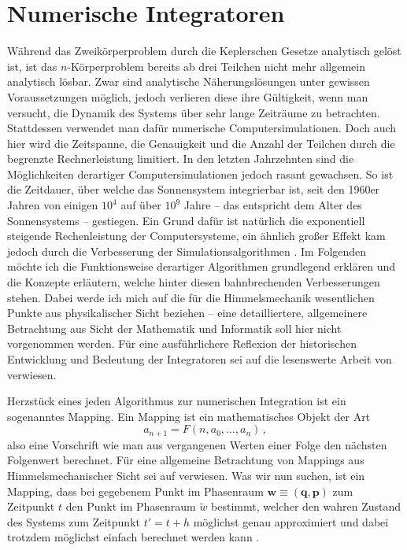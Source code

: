 \documentclass[12pt,a4paper,twoside,open=right,bibliography=totoc]{scrbook}
\renewcommand{\cite}{ \citep}
\renewcommand{\vec}{\mathbf}
\begin{document}
\section{Numerische Integratoren}
Während das Zweikörperproblem durch die Keplerschen Gesetze analytisch gelöst ist, ist das $n$-Körperproblem bereits ab drei Teilchen nicht mehr allgemein analytisch lösbar.
Zwar sind analytische Näherungslösungen unter gewissen Voraussetzungen möglich, jedoch verlieren diese ihre Gültigkeit, wenn man versucht, die Dynamik des Systems über sehr lange Zeiträume zu betrachten. Stattdessen verwendet man dafür numerische Computersimulationen.
Doch auch hier wird die Zeitspanne, die Genauigkeit und die Anzahl der Teilchen durch die begrenzte Rechnerleistung limitiert.
In den letzten Jahrzehnten sind die Möglichkeiten derartiger Computersimulationen jedoch rasant gewachsen. So ist die Zeitdauer, über welche das Sonnensystem integrierbar ist, seit den 1960er Jahren von einigen $10^4$ auf über $10^9$ Jahre – das entspricht dem Alter des Sonnensystems – gestiegen. Ein Grund dafür ist natürlich die exponentiell steigende Rechenleistung der Computersysteme, ein ähnlich großer Effekt kam jedoch durch die Verbesserung der Simulationsalgorithmen\cite{Morbidelli2002}. Im Folgenden möchte ich die Funktionsweise derartiger Algorithmen grundlegend erklären und die Konzepte erläutern, welche hinter diesen bahnbrechenden Verbesserungen stehen. Dabei werde ich mich auf die für die Himmelsmechanik wesentlichen Punkte aus physikalischer Sicht beziehen -- eine detailliertere, allgemeinere Betrachtung aus Sicht der Mathematik und Informatik soll hier nicht vorgenommen werden.
Für eine ausführlichere Reflexion der historischen Entwicklung und Bedeutung der Integratoren sei auf die lesenswerte Arbeit von \cite{Morbidelli2002} verwiesen.

Herzstück eines jeden Algorithmus zur numerischen Integration ist ein sogenanntes Mapping. Ein Mapping ist ein mathematisches Objekt der Art
\begin{equation}
a_{n+1} = F(n,a_0,...,a_n) \,,
\end{equation}
also eine Vorschrift wie man aus vergangenen Werten einer Folge den nächsten Folgenwert berechnet. Für eine allgemeine Betrachtung von Mappings aus Himmelsmechanischer Sicht sei auf \cite{Dvorak2005} verwiesen.
Was wir nun suchen, ist ein Mapping, dass bei gegebenem Punkt im Phasenraum $\vec{w}\equiv(\vec{q},\vec{p})$ zum Zeitpunkt $t$ den Punkt im Phasenraum $\tilde{w}$ bestimmt, welcher den wahren Zustand des Systems zum Zeitpunkt $t'=t+h$ möglichst genau approximiert und dabei trotzdem möglichst einfach berechnet werden kann\cite{Binney2008}.
\end{document}
